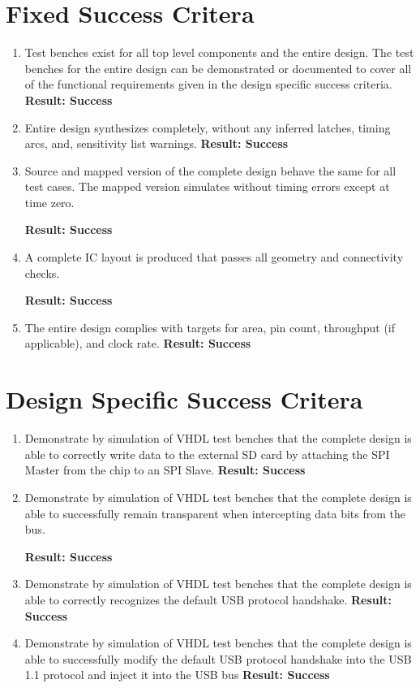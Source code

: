 \documentclass[12pt,letter,oneside]{report}
\begin{document}
\section{Fixed Success Critera}
\begin{enumerate}
	\item Test benches exist for all top level components and the entire design. The test benches for the entire design can be demonstrated or documented to cover all of the functional requirements given in the design specific success criteria. \hfill \textbf{Result: Success}
	\item Entire design synthesizes completely, without any inferred latches, timing arcs, and, sensitivity  list warnings. \hfill \textbf{Result: Success}
	\item Source and mapped version of the complete design behave the same for all test cases. The mapped version simulates without timing errors except at time zero. \\ \vspace{-2.5em}\begin{flushright}\textbf{Result: Success}\end{flushright}
	\item A complete IC layout is produced that passes all geometry and connectivity checks. \\  \vspace{-2.5em}\begin{flushright}\textbf{Result: Success}\end{flushright}
	\item The entire design complies with targets for area, pin count, throughput (if applicable), and clock rate.  \hfill \textbf{Result: Success}
\end{enumerate}
\section{Design Specific Success Critera}
\begin{enumerate}
	\item Demonstrate by simulation of VHDL test benches that the complete design is able to correctly write data to the external SD card by attaching the SPI Master from the chip to an SPI Slave. \hfill \textbf{Result: Success}
	\item Demonstrate by simulation of VHDL test benches that the complete design is able to successfully remain transparent when intercepting data bits from the bus. \\ \vspace{-2.5em}\begin{flushright}\textbf{Result: Success}\end{flushright}
	\item Demonstrate by simulation of VHDL test benches that the complete design is able to correctly recognizes the default USB protocol handshake. \hfill \textbf{Result: Success}
	\item Demonstrate by simulation of VHDL test benches that the complete design is able to successfully modify the default USB protocol handshake into the USB 1.1 protocol and inject it into the USB bus \hfill \textbf{Result: Success}
\end{enumerate}
\appendix
\end{document}
